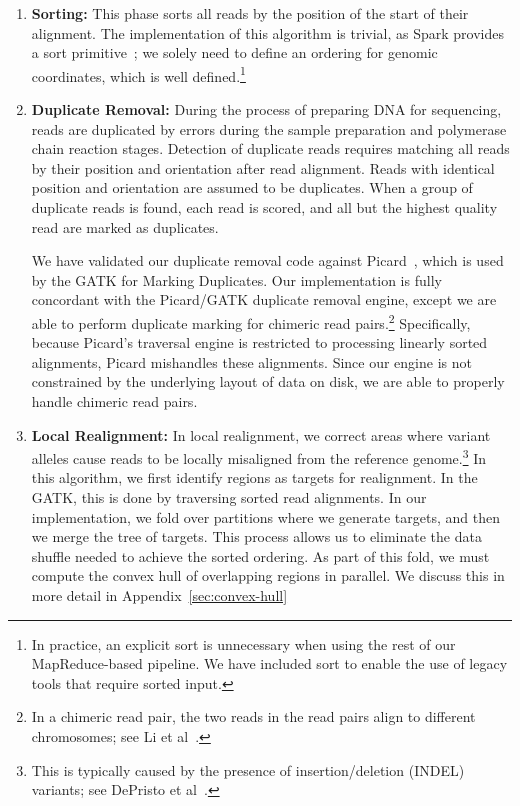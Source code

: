 \documentclass{acm_proc_article-sp}
\begin{document}
\begin{enumerate}
\item \textbf{Sorting:} This phase sorts all reads by the position of the start of their alignment. The implementation
of this algorithm is trivial, as Spark provides a sort primitive~\cite{zaharia10}; we solely need to define an
ordering for genomic coordinates, which is well defined.\footnote{In practice, an explicit sort is unnecessary when
using the rest of our MapReduce-based pipeline. We have included sort to enable the use of legacy tools that
require sorted input.}
\item \textbf{Duplicate Removal:} During the process of preparing DNA for sequencing, reads are duplicated by
errors during the sample preparation and polymerase chain reaction stages. Detection of duplicate reads
requires matching all reads by their position and orientation after read alignment. Reads with identical position
and orientation are assumed to be duplicates. When a group of duplicate reads is found, each read is scored,
and all but the highest quality read are marked as duplicates.

We have validated our duplicate removal code against Picard~\cite{picard}, which is used by the GATK
for Marking Duplicates. Our implementation is fully concordant with the Picard/GATK duplicate removal
engine, except we are able to perform duplicate marking for chimeric read pairs.\footnote{In a chimeric read pair,
the two reads in the read pairs align to different chromosomes; see Li et al~\cite{li10}.}
Specifically, because Picard's traversal engine is restricted to processing linearly sorted alignments,
Picard mishandles these alignments. Since our engine is not constrained by the underlying layout of data
on disk, we are able to properly handle chimeric read pairs.
\item \textbf{Local Realignment:} In local realignment, we correct areas where variant alleles cause reads to be
locally misaligned from the reference genome.\footnote{This is typically caused by the presence of
insertion/deletion (INDEL) variants; see DePristo et al~\cite{depristo11}.} In this algorithm, we first identify regions
as targets for realignment. In the GATK, this is done by traversing sorted read alignments. In our implementation,
we fold over partitions where we generate targets, and then we merge the tree of targets. This process allows us
to eliminate the data shuffle needed to achieve the sorted ordering. As part of this fold, we must
compute the convex hull of overlapping regions in parallel. We discuss this in more detail in
Appendix~\ref{sec:convex-hull}


\end{enumerate}
\end{document}
